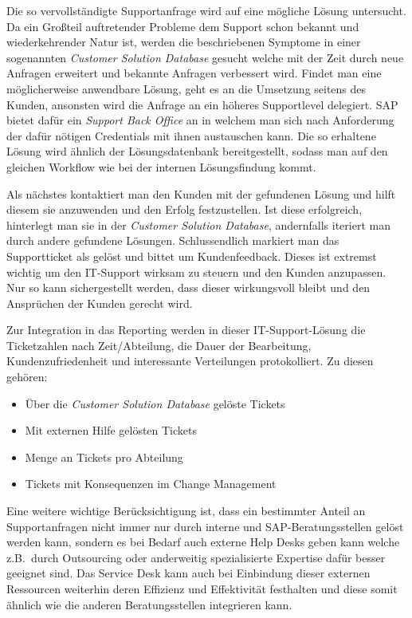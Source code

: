 Die so vervollständigte Supportanfrage wird auf eine mögliche Lösung
untersucht.  Da ein Großteil auftretender Probleme dem Support schon
bekannt und wiederkehrender Natur ist, werden die beschriebenen
Symptome in einer sogenannten \emph{Customer Solution Database}
gesucht welche mit der Zeit durch neue Anfragen erweitert und bekannte
Anfragen verbessert wird.  Findet man eine möglicherweise anwendbare
Lösung, geht es an die Umsetzung seitens des Kunden, ansonsten wird
die Anfrage an ein höheres Supportlevel delegiert.  SAP bietet dafür
ein \emph{Support Back Office} an in welchem man sich nach Anforderung
der dafür nötigen Credentials mit ihnen austauschen kann.  Die so
erhaltene Lösung wird ähnlich der Lösungsdatenbank bereitgestellt,
sodass man auf den gleichen Workflow wie bei der internen
Lösungsfindung kommt.

Als nächstes kontaktiert man den Kunden mit der gefundenen Lösung und
hilft diesem sie anzuwenden und den Erfolg festzustellen.  Ist diese
erfolgreich, hinterlegt man sie in der \emph{Customer Solution
  Database}, andernfalls iteriert man durch andere gefundene Lösungen.
Schlussendlich markiert man das Supportticket als gelöst und bittet um
Kundenfeedback.  Dieses ist extremst wichtig um den IT-Support wirksam
zu steuern und den Kunden anzupassen.  Nur so kann sichergestellt
werden, dass dieser wirkungsvoll bleibt und den Ansprüchen der Kunden
gerecht wird.

Zur Integration in das Reporting werden in dieser IT-Support-Lösung
die Ticketzahlen nach Zeit/Abteilung, die Dauer der Bearbeitung,
Kundenzufriedenheit und interessante Verteilungen protokolliert.  Zu
diesen gehören:

\begin{itemize}
\item Über die \emph{Customer Solution Database} gelöste Tickets
\item Mit externen Hilfe gelösten Tickets
\item Menge an Tickets pro Abteilung
\item Tickets mit Konsequenzen im Change Management
\end{itemize}

Eine weitere wichtige Berücksichtigung ist, dass ein bestimmter Anteil
an Supportanfragen nicht immer nur durch interne und
SAP-Beratungsstellen gelöst werden kann, sondern es bei Bedarf auch
externe Help Desks geben kann welche z.B.~durch Outsourcing oder
anderweitig spezialisierte Expertise dafür besser geeignet sind.  Das
Service Desk kann auch bei Einbindung dieser externen Ressourcen
weiterhin deren Effizienz und Effektivität festhalten und diese somit
ähnlich wie die anderen Beratungsstellen integrieren kann.

